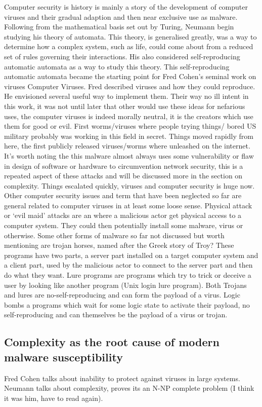 Computer security is history is mainly a story of the development of computer viruses and their gradual adaption and then near exclusive use as malware. Following from the mathematical basis set out by Turing, Neumann begin studying his theory of automata. This theory, is generalised greatly, was a way to determine how a complex system, such as life, could come about from a reduced set of rules governing their interactions. His also considered self-reproducing automatic automata as a way to study this theory. This self-reproducing automatic automata became the starting point for Fred Cohen's seminal work on viruses Computer Viruses. Fred described viruses and how they could reproduce. He envisioned several useful way to implement them. Their way no ill intent in this work, it was not until later that other would use these ideas for nefarious uses, the computer viruses is indeed morally neutral, it is the creators which use them for good or evil. 
First worms/viruses where people trying things/ bored
US military probably was working in this field in secret. 
Things moved rapidly from here, the first publicly released viruses/worms where unleashed on the internet. It’s worth noting the this malware almost always uses some vulnerability or flaw in design of software or hardware to circumvention network security, this is a repeated aspect of these attacks and will be discussed more in the section on complexity. Things escalated quickly, viruses and computer security is huge now.
Other computer security issues and term that have been neglected so far are general related to computer viruses in at least some loose sense. Physical attack or ‘evil maid’ attacks are an where a malicious actor get physical access to a computer system. They could then potentially install some malware, virus or otherwise. Some other forms of malware so far not discussed but worth mentioning are trojan horses, named after the Greek story of Troy? These programs have two parts, a server part installed on a target computer system and a client part, used by the malicious actor to connect to the server part and then do what they want. Lure programs are programs which try to trick or deceive a user by looking like another program (Unix login lure program). Both Trojans and lures are no-self-reproducing and can form the payload of a virus. Logic bombs a programs which wait for some logic state to activate their payload, no self-reproducing and can themselves be the payload of a virus or trojan.


\subsection{Complexity as the root cause of modern malware susceptibility}
Fred Cohen talks about inability to protect against viruses in large systems.
Neumann talks about complexity, proves its an N-NP complete problem (I think it was him, have to read again).
